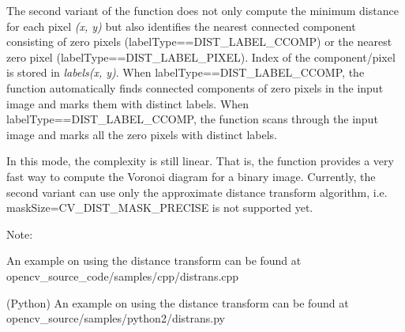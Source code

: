 The second variant of the function does not only compute the minimum distance for each pixel {\itshape (x, y)} but also identifies the nearest connected component consisting of zero pixels ({\ttfamily label\+Type==D\+I\+S\+T\+\_\+\+L\+A\+B\+E\+L\+\_\+\+C\+C\+O\+MP}) or the nearest zero pixel ({\ttfamily label\+Type==D\+I\+S\+T\+\_\+\+L\+A\+B\+E\+L\+\_\+\+P\+I\+X\+EL}). Index of the component/pixel is stored in {\itshape labels(x, y)}. When {\ttfamily label\+Type==D\+I\+S\+T\+\_\+\+L\+A\+B\+E\+L\+\_\+\+C\+C\+O\+MP}, the function automatically finds connected components of zero pixels in the input image and marks them with distinct labels. When {\ttfamily label\+Type==D\+I\+S\+T\+\_\+\+L\+A\+B\+E\+L\+\_\+\+C\+C\+O\+MP}, the function scans through the input image and marks all the zero pixels with distinct labels.

In this mode, the complexity is still linear. That is, the function provides a very fast way to compute the Voronoi diagram for a binary image. Currently, the second variant can use only the approximate distance transform algorithm, i.\+e. {\ttfamily mask\+Size=C\+V\+\_\+\+D\+I\+S\+T\+\_\+\+M\+A\+S\+K\+\_\+\+P\+R\+E\+C\+I\+SE} is not supported yet.

Note\+:


\begin{DoxyItemize}
\item An example on using the distance transform can be found at opencv\+\_\+source\+\_\+code/samples/cpp/distrans.\+cpp 
\item (Python) An example on using the distance transform can be found at opencv\+\_\+source/samples/python2/distrans.\+py 
\end{DoxyItemize}


